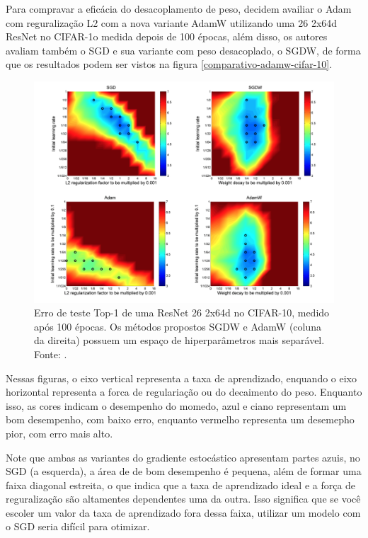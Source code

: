 Para compravar a eficácia do desacoplamento de peso, \textcite{AdamWMethod} decidem availiar o Adam com reguralização L2 com a nova variante AdamW utilizando uma 26 2x64d ResNet no CIFAR-1o medida depois de 100 épocas, além disso, os autores avaliam também o SGD e sua variante com peso desacoplado, o SGDW, de forma que os resultados podem ser vistos na figura \ref{comparativo-adamw-cifar-10}.

\begin{figure}[h]
    \centering
    \includegraphics[width=1\linewidth]{../imagens/retropropagacao-gradiente/comparativo-adamw-cifar-10.png}
    
    \caption[Erro de teste Top-1 da ResNet no CIFAR-10]{%
        Erro de teste Top-1 de uma ResNet 26 2x64d no CIFAR-10, medido após 100 épocas. Os métodos propostos SGDW e AdamW (coluna da direita) possuem um espaço de hiperparâmetros mais separável.
        \newline
        \small Fonte: \parencite{AdamWMethod}.
    }
    \label{fig:comparativo-adamw-cifar-10}
\end{figure}

Nessas figuras, o eixo vertical representa a taxa de aprendizado, enquando o eixo horizontal representa a forca de regulariação ou do decaimento do peso. Enquanto isso, as cores indicam o desempenho do momedo, azul e ciano representam um bom desempenho, com baixo erro, enquanto vermelho representa um desemepho pior, com erro mais alto.

Note que ambas as variantes do gradiente estocástico apresentam partes azuis, no SGD (a esquerda), a área de de bom desempenho é pequena, além de formar uma faixa diagonal estreita, o que indica que a taxa de aprendizado ideal e a força de reguralização são altamentes dependentes uma da outra. Isso significa que se você escoler um valor da taxa de aprendizado fora dessa faixa, utilizar um modelo com o SGD seria difícil para otimizar.

